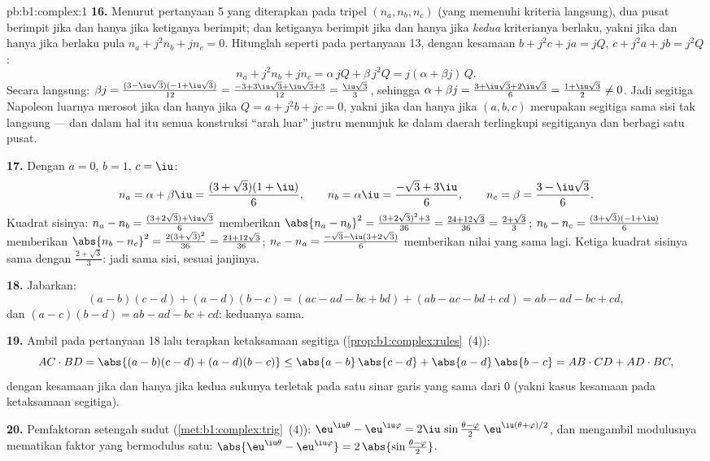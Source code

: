\begin{solution}{pb:b1:complex:1}
\textbf{16.} Menurut pertanyaan 5 yang diterapkan pada tripel $(n_a, n_b, n_c)$
(yang memenuhi kriteria langsung), dua pusat berimpit jika dan hanya jika
ketiganya berimpit; dan ketiganya berimpit jika dan hanya jika \emph{kedua} kriterianya berlaku,
yakni jika dan hanya jika berlaku pula $n_a + j^2 n_b + j n_c = 0$. Hitunglah seperti pada
pertanyaan 13, dengan kesamaan $b + j^2c + ja = jQ$, $c + j^2a +
jb = j^2Q$:
\[
n_a + j^2 n_b + j n_c
= \alpha\,jQ + \beta\,j^2 Q = j(\alpha + \beta j)\,Q .
\]
Secara langsung: $\beta j = \frac{(3 -
\iu\sqrt3)(-1 + \iu\sqrt3)}{12} = \frac{-3 + 3\iu\sqrt3 +
\iu\sqrt3 + 3}{12} = \frac{\iu\sqrt3}3$, sehingga $\alpha + \beta j =
\frac{3 + \iu\sqrt3 + 2\iu\sqrt3}6 = \frac{1 + \iu\sqrt3}2 \neq
0$. Jadi segitiga Napoleon luarnya merosot jika dan hanya jika $Q = a +
j^2b + jc = 0$, yakni jika dan hanya jika $(a, b, c)$ merupakan segitiga sama sisi
tak langsung --- dan dalam hal itu semua konstruksi ``arah luar'' justru menunjuk
ke dalam daerah terlingkupi segitiganya dan berbagi satu pusat.

\textbf{17.} Dengan $a = 0$, $b = 1$, $c = \iu$:
\[
n_a = \alpha + \beta\iu = \frac{(3 + \sqrt3)(1 + \iu)}6,
\qquad
n_b = \alpha\iu = \frac{-\sqrt3 + 3\iu}6,
\qquad
n_c = \beta = \frac{3 - \iu\sqrt3}6 .
\]
Kuadrat sisinya: $n_a - n_b = \frac{(3 + 2\sqrt3) +
\iu\sqrt3}6$ memberikan $\abs{n_a - n_b}^2 = \frac{(3 + 2\sqrt3)^2 +
3}{36} = \frac{24 + 12\sqrt3}{36} = \frac{2 + \sqrt3}3$; $n_b -
n_c = \frac{(3 + \sqrt3)(-1 + \iu)}6$ memberikan $\abs{n_b - n_c}^2 =
\frac{2(3 + \sqrt3)^2}{36} = \frac{24 + 12\sqrt3}{36}$; $n_c - n_a
= \frac{-\sqrt3 - \iu(3 + 2\sqrt3)}6$ memberikan nilai yang sama lagi.
Ketiga kuadrat sisinya sama dengan $\frac{2 + \sqrt3}3$: jadi sama sisi,
sesuai janjinya.

\textbf{18.} Jabarkan:
\[
(a - b)(c - d) + (a - d)(b - c)
= (ac - ad - bc + bd) + (ab - ac - bd + cd)
= ab - ad - bc + cd ,
\]
dan $(a - c)(b - d) = ab - ad - bc + cd$: keduanya sama.

\textbf{19.} Ambil  pada pertanyaan 18 lalu terapkan ketaksamaan
segitiga (\cref{prop:b1:complex:rules}~(4)):
\[
AC \cdot BD = \abs{(a-b)(c-d) + (a-d)(b-c)}
\leq \abs{a-b}\,\abs{c-d} + \abs{a-d}\,\abs{b-c}
= AB \cdot CD + AD \cdot BC ,
\]
dengan kesamaan jika dan hanya jika kedua sukunya terletak pada satu sinar garis yang sama dari $0$
(yakni kasus kesamaan pada ketaksamaan segitiga).

\textbf{20.} Pemfaktoran setengah sudut
(\cref{met:b1:complex:trig}~(4)):
$\eu^{\iu\theta} - \eu^{\iu\varphi} = 2\iu\,\sin\frac{\theta -
\varphi}2\;\eu^{\iu(\theta + \varphi)/2}$, dan mengambil modulusnya mematikan
faktor yang bermodulus satu: $\abs{\eu^{\iu\theta} - \eu^{\iu\varphi}}
= 2\,\abs{\sin\frac{\theta - \varphi}2}$.


\end{solution}
